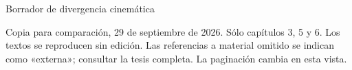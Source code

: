 \documentclass[spanish,a4paper,12pt]{article}
\begin{document}
\begin{center}\Large Borrador de divergencia cinemática\end{center}
\noindent Copia para comparación, 29 de septiembre de 2026. Sólo capítulos 3, 5 y 6.
Los textos se reproducen sin edición. Las referencias a material omitido se indican
como «externa»; consultar la tesis completa. La paginación cambia en esta vista.
\tableofcontents

\clearpage
\setcounter{section}{2}
\label{review:03}


\clearpage
\setcounter{section}{4}
\label{review:05}


\clearpage
\setcounter{section}{5}
\label{review:06}


\clearpage
\printbibliography
\end{document}
